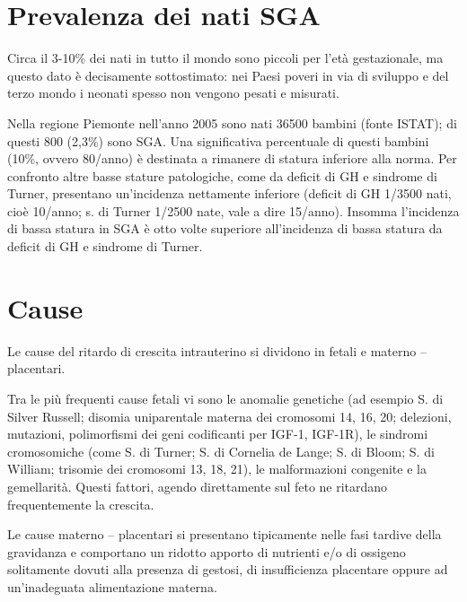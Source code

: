 \section{Prevalenza dei nati SGA}

Circa il 3-10\% dei nati in tutto il mondo sono piccoli per l'età gestazionale, 
ma questo dato è decisamente sottostimato: nei Paesi poveri in via di sviluppo 
e del terzo mondo i neonati spesso non vengono pesati e misurati\cite{sga-1}.

Nella regione Piemonte nell'anno 2005 sono nati 36500 bambini (fonte ISTAT); di questi 800 (2,3\%) sono SGA. Una significativa percentuale di questi bambini (10\%, ovvero 80/anno) è destinata a rimanere di statura inferiore alla norma. Per confronto altre basse stature patologiche, come da deficit di GH e sindrome di Turner, presentano un'incidenza nettamente inferiore (deficit di GH 1/3500 nati, cioè 10/anno; s. di Turner 1/2500 nate, vale a dire 15/anno). Insomma l'incidenza di bassa statura in SGA è otto volte superiore all'incidenza di bassa statura da deficit di GH e sindrome di Turner. 


\section{Cause}


Le cause del ritardo di crescita intrauterino si dividono in
fetali e materno -- placentari.


Tra le più frequenti cause fetali vi sono le anomalie genetiche (ad esempio S. di Silver Russell; disomia uniparentale materna dei cromosomi 14, 16, 20; delezioni, mutazioni, polimorfismi dei geni codificanti per IGF-1, IGF-1R), le sindromi cromosomiche (come S. di Turner; S. di Cornelia de Lange; S. di Bloom; S. di William; trisomie dei cromosomi 13, 18, 21), le malformazioni congenite e la gemellarità. Questi fattori, agendo direttamente sul feto ne ritardano frequentemente la crescita.


Le cause materno -- placentari si presentano tipicamente nelle fasi tardive della gravidanza
e comportano un ridotto apporto di nutrienti e/o di ossigeno solitamente dovuti alla presenza di 
gestosi, di insufficienza placentare oppure ad un'inadeguata alimentazione materna.


